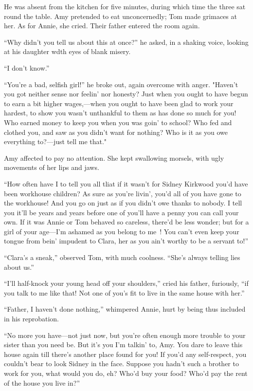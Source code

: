He was absent from the kitchen for five minutes, during which time the
three sat round the table. Amy pretended to eat unconcernedly; Tom made
grimaces at her. As for Annie, she cried. Their father entered the room
again.

``Why didn't you tell us about this at once?'' he asked, in a shaking
voice, looking at his daughter wdth eyes of blank misery.

``I don't know.''

``You're a bad, selfish girl!'' he broke out, again overcome with anger.
"Haven't you got neither sense nor feelin' nor honesty? Just when you
ought to have begun to earn a bit higher wages,---when you ought to have
been glad to work your hardest, to show you wasn't unthankful to them as
has done so much for you! Who earned money to keep you when you was
goin' to school? Who fed and clothed you, and saw as you didn't want
{\protect\hypertarget{260}{}{}} for nothing? Who is it as you owe
everything to?---just tell me that."

Amy affected to pay no attention. She kept swallowing morsels, with ugly
movements of her lips and jaws.

``How often have I to tell you all tliat if it wasn't for Sidney
Kirkwood you'd have been workhouse children? As sure as you're livin',
you'd all of you have gone to the workhouse! And you go on just as if
you didn't owe thanks to nobody. I tell you it'll be years and years
before one of you'll have a penny you can call your own. If it was Annie
or Tom behaved so careless, there'd be less wonder; but for a girl of
your age---I'm ashamed as you belong to me~! You can't even keep your
tongue from bein' impudent to Clara, her as you ain't worthy to be a
servant to!''

``Clara's a sneak,'' observed Tom, with much coolness. ``She's always
telling lies about us.''

``I'll half-knock your young head off your shoulders,'' cried his
father, furiously, ``if you talk to me like that! Not one of you's fit
to live in the same house with her.''

``Father, I haven't done nothing,'' whimpered
{\protect\hypertarget{261}{}{}} Annie, hurt by being thus included in
his reprobation.

``No more you have---not just now, but you're often enough more trouble
to your sister than you need be. But it's you I'm talkin' to, Amy. You
dare to leave this house again till there's another place found for you!
If you'd any self-respect, you couldn't bear to look Sidney in the face.
Suppose you hadn't such a brother to work for you, what would you do,
eh? Who'd buy your food? Who'd pay the rent of the house you live in?''

